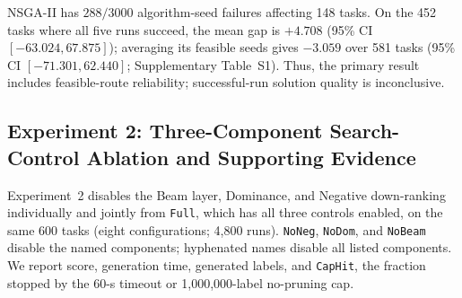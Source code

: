 NSGA-II has \(288/3000\) algorithm-seed failures affecting 148 tasks. On the
452 tasks where all five runs succeed, the mean gap is \(+4.708\) (95\% CI
\([-63.024,67.875]\)); averaging its feasible seeds gives \(-3.059\) over 581
tasks (95\% CI \([-71.301,62.440]\); Supplementary Table~S1). Thus, the primary result includes
feasible-route reliability; successful-run solution quality is inconclusive.

\subsection{Experiment 2: Three-Component Search-Control Ablation and Supporting Evidence}
Experiment~2 disables the Beam layer, Dominance, and Negative down-ranking
individually and jointly from \texttt{Full}, which has all three controls
enabled, on the same 600 tasks (eight configurations; 4,800 runs).
\texttt{NoNeg}, \texttt{NoDom}, and \texttt{NoBeam} disable the named
components; hyphenated names disable all listed components. We report score,
generation time, generated labels, and \texttt{CapHit},
the fraction stopped by the 60-s timeout or 1,000,000-label no-pruning cap.

\begin{table}[t]
    \centering
    \caption{Canonical Experiment 2 ablation (means over 600 matched tasks).
    Generation is solver wall time; Labels counts the initial label plus every label
    created by edge extension before later Dominance/Beam removal; CapHit is the
    percentage stopped by the 60-s timeout or the triple-disabled configuration's
    1,000,000-label cap.}
    \label{tab:exp2_main_ablation}
\end{table}

